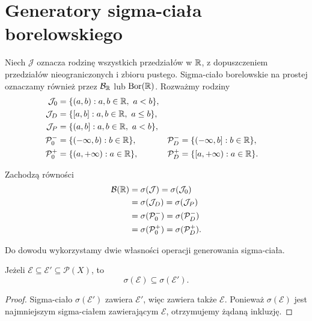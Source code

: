 \section{Generatory sigma-ciała borelowskiego}
\label{sec:generatory-borelowskie}

Niech $\mathcal{J}$ oznacza rodzinę wszystkich przedziałów w $\mathbb{R}$,
z dopuszczeniem przedziałów nieograniczonych i zbioru pustego.
Sigma-ciało borelowskie na prostej oznaczamy również przez
$\mathcal{B}_{\mathbb{R}}$ lub $\operatorname{Bor}(\mathbb{R})$.
Rozważmy rodziny
\begin{align*}
  \mathcal{J}_0&=\{(a,b):a,b\in\mathbb{R},\ a<b\},\\
  \mathcal{J}_D&=\{[a,b]:a,b\in\mathbb{R},\ a\leq b\},\\
  \mathcal{J}_P&=\{(a,b]:a,b\in\mathbb{R},\ a<b\},\\
  \mathcal{P}_0^-&=\{(-\infty,b):b\in\mathbb{R}\},
  &\mathcal{P}_D^-&=\{(-\infty,b]:b\in\mathbb{R}\},\\
  \mathcal{P}_0^+&=\{(a,+\infty):a\in\mathbb{R}\},
  &\mathcal{P}_D^+&=\{[a,+\infty):a\in\mathbb{R}\}.
\end{align*}

\begin{twierdzenie}
\label{tw:generatory-borelowskie}
Zachodzą równości
\begin{equation}
  \begin{aligned}
    \mathcal{B}(\mathbb{R})
      &=\sigma(\mathcal{J})=\sigma(\mathcal{J}_0)\\
      &=\sigma(\mathcal{J}_D)=\sigma(\mathcal{J}_P)\\
      &=\sigma(\mathcal{P}_0^-)=\sigma(\mathcal{P}_D^-)\\
      &=\sigma(\mathcal{P}_0^+)=\sigma(\mathcal{P}_D^+).
  \end{aligned}
  \label{eq:generatory-borelowskie}
\end{equation}
\end{twierdzenie}

Do dowodu wykorzystamy dwie własności operacji generowania sigma-ciała.

\begin{lemat}
\label{lem:monotonicznosc-generowania}
Jeżeli $\mathcal{E}\subseteq\mathcal{E}'\subseteq\mathcal{P}(X)$, to
\[
  \sigma(\mathcal{E})\subseteq\sigma(\mathcal{E}').
\]
\end{lemat}

\begin{proof}
Sigma-ciało $\sigma(\mathcal{E}')$ zawiera $\mathcal{E}'$, więc zawiera
także $\mathcal{E}$. Ponieważ $\sigma(\mathcal{E})$ jest najmniejszym
sigma-ciałem zawierającym $\mathcal{E}$, otrzymujemy żądaną inkluzję.
\end{proof}

